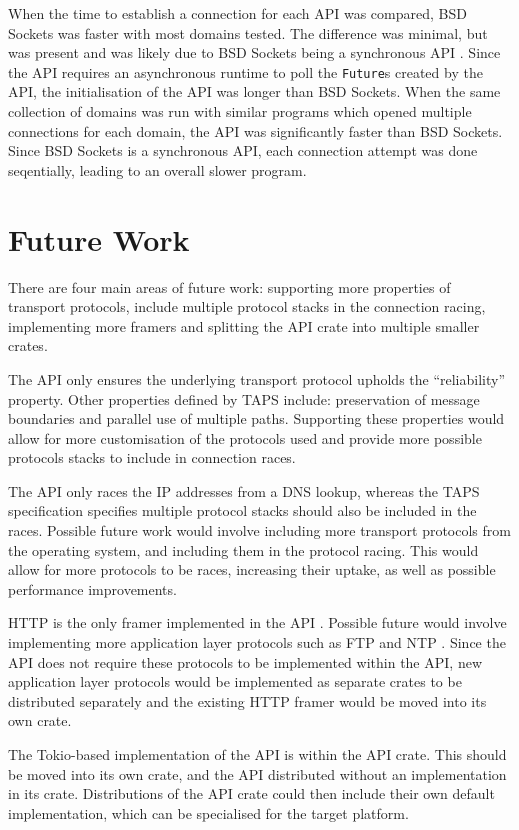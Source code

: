 \documentclass{l4proj}
\begin{document}
When the time to establish a connection for each API was compared, BSD Sockets was faster with most domains tested.
The difference was minimal, but was present and was likely due to BSD Sockets being a synchronous API .
Since the API requires an asynchronous runtime to poll the \texttt{Future}s created by the API, the initialisation
of the API was longer than BSD Sockets.
When the same collection of domains was run with similar programs which opened multiple connections for each domain,
the API was significantly faster than BSD Sockets.
Since BSD Sockets is a synchronous API, each connection attempt was done seqentially, leading to an overall slower
program.

\section{Future Work}\label{sec:future-work}
There are four main areas of future work: supporting more properties of transport protocols, include multiple protocol
stacks in the connection racing, implementing more framers and splitting the API crate into multiple smaller crates.

The API only ensures the underlying transport protocol upholds the “reliability'' property.
Other properties defined by TAPS include: preservation of message boundaries and parallel use of multiple paths.
Supporting these properties would allow for more customisation of the protocols used and provide more possible
protocols stacks to include in connection races.

The API only races the IP addresses from a DNS lookup, whereas the TAPS specification specifies multiple protocol
stacks should also be included in the races.
Possible future work would involve including more transport protocols from the operating system, and including them in
the protocol racing.
This would allow for more protocols to be races, increasing their uptake, as well as possible performance improvements.

HTTP is the only framer implemented in the API .
Possible future would involve implementing more application layer protocols such as FTP and NTP .
Since the API does not require these protocols to be implemented within the API, new application layer protocols would
be implemented as separate crates to be distributed separately and the existing HTTP framer would be moved into its
own crate.

The Tokio-based implementation of the API is within the API crate.
This should be moved into its own crate, and the API distributed without an implementation in its crate.
Distributions of the API crate could then include their own default implementation, which can be specialised for the
target platform.
\end{document}
